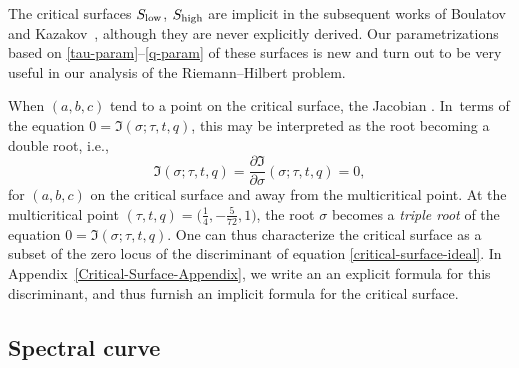 \documentclass[pdftex]{sigma}
\numberwithin{equation}{section}
\begin{document}
The critical surfaces $S_{{\rm low}}$, $S_{{\rm high}}$ are implicit in the subsequent works of Boulatov and Kazakov~\cite{Kazakov2}, although they are never explicitly derived. Our parametrizations based on \eqref{tau-param}--\eqref{q-param} of these surfaces is new and turn out to be very useful in our analysis of the Riemann--Hilbert problem.



\begin{Remark}
When $(a,b,c)$ tend to a point on the critical surface, the Jacobian
 . In~terms of the equation $0 = \mathfrak{I}(\sigma;\tau,t,q)$, this may be interpreted as the root  becoming a double root, i.e.,
 \begin{equation*}
 \mathfrak{I}(\sigma;\tau,t,q) = \frac{\partial \mathfrak{I} }{\partial \sigma}(\sigma;\tau,t,q) = 0,
 \end{equation*}
 for $(a,b,c)$ on the critical surface and away from the multicritical point. At the multicritical point $(\tau,t,q) = \bigl(\frac{1}{4},-\frac{5}{72},1\bigr)$, the
 root $\sigma$ becomes a \textit{triple root} of the equation $0 = \mathfrak{I}(\sigma;\tau,t,q)$. One can thus characterize the critical surface as a subset of the zero locus of the discriminant of equation \eqref{critical-surface-ideal}. In Appendix~\ref{Critical-Surface-Appendix}, we write an
 an explicit formula for this discriminant, and thus furnish an implicit formula for the critical surface.
\end{Remark}




 \subsection{Spectral curve}
\end{document}

